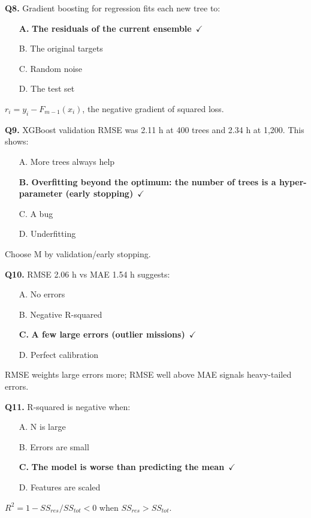 \documentclass[11pt]{article}
\begin{document}
{\noindent\textbf{Q8.} Gradient boosting for regression fits each new tree to:\begin{itemize}[leftmargin=2.2em,itemsep=0pt,topsep=1pt]\item[\textbf{A.}] \textbf{The residuals of the current ensemble}~{\color{GrnN}$\checkmark$}\item[B.] The original targets\item[C.] Random noise\item[D.] The test set\end{itemize} $r_i=y_i-F_{m-1}(x_i)$, the negative gradient of squared loss.\par\medskip

\noindent\textbf{Q9.} XGBoost validation RMSE was 2.11 h at 400 trees and 2.34 h at 1,200. This shows:\begin{itemize}[leftmargin=2.2em,itemsep=0pt,topsep=1pt]\item[A.] More trees always help\item[\textbf{B.}] \textbf{Overfitting beyond the optimum: the number of trees is a hyper-parameter (early stopping)}~{\color{GrnN}$\checkmark$}\item[C.] A bug\item[D.] Underfitting\end{itemize} Choose M by validation/early stopping.\par\medskip

\noindent\textbf{Q10.} RMSE 2.06 h vs MAE 1.54 h suggests:\begin{itemize}[leftmargin=2.2em,itemsep=0pt,topsep=1pt]\item[A.] No errors\item[B.] Negative R-squared\item[\textbf{C.}] \textbf{A few large errors (outlier missions)}~{\color{GrnN}$\checkmark$}\item[D.] Perfect calibration\end{itemize} RMSE weights large errors more; RMSE well above MAE signals heavy-tailed errors.\par\medskip

\noindent\textbf{Q11.} R-squared is negative when:\begin{itemize}[leftmargin=2.2em,itemsep=0pt,topsep=1pt]\item[A.] N is large\item[B.] Errors are small\item[\textbf{C.}] \textbf{The model is worse than predicting the mean}~{\color{GrnN}$\checkmark$}\item[D.] Features are scaled\end{itemize} $R^2=1-SS_{res}/SS_{tot}<0$ when $SS_{res}>SS_{tot}$.\par\medskip

}
\end{document}
